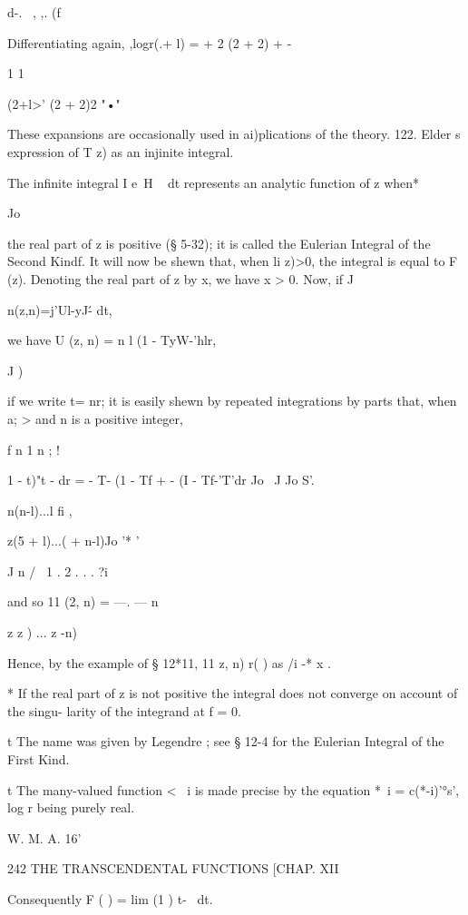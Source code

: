 d-. \ , ,. (f



Differentiating again, ,logr(.+ l) = + 2 (2 + 2) + -



1 1

 (2+l>' (2 + 2)2 "•"



These expansions are occasionally used in ai)plications of the theory.
122. Elder s expression of T z) as an injinite integral.

The infinite integral I e~H ~ dt represents an analytic function of z
when*

Jo

the real part of z is positive (§ 5-32); it is called the Eulerian
Integral of the Second Kindf. It will now be shewn that, when li z)>0,
the integral is equal to F (z). Denoting the real part of z by x, we
have x > 0. Now, if J

n(z,n)=j'Ul-yJ\'- dt,

we have U (z, n) = n l (1 - TyW-'hlr,

J )

if we write t= nr; it is easily shewn by repeated integrations by
parts that, when a; > and n is a positive integer,

f n 1 n ; !

 1 - t)"t - dr = - T- (1 - Tf + - (I - Tf-'T'dr Jo \ J Jo S'.

n(n-l)...l fi ,

z(5 + l)...( + n-l)Jo '* '

J n / \ 1 . 2 . . . ?i

and so 11 (2, n) = —. — n

z z ) ... z -n)

Hence, by the example of § 12*11, 11 z, n) r( ) as /i -* x .

* If the real part of z is not positive the integral does not converge
on account of the singu- larity of the integrand at f = 0.

t The name was given by Legendre ; see § 12-4 for the Eulerian
Integral of the First Kind.

t The many-valued function < ~i is made precise by the equation *~i =
c(*-i)'°s', log r being purely real.

W. M. A. 16'



242 THE TRANSCENDENTAL FUNCTIONS [CHAP. XII

Consequently F ( ) = lim (1 ) t-~ dt.

